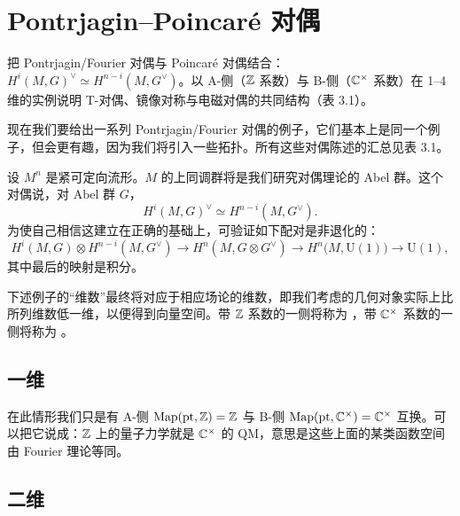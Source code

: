 \section{Pontrjagin--Poincaré 对偶}

\begin{sectionkey}
把 Pontrjagin/Fourier 对偶与 Poincaré 对偶结合：$H^{i}(M,G)^{\vee}\simeq H^{n-i}(M,G^{\vee})$。以 A-侧（$\mathbb{Z}$ 系数）与 B-侧（$\mathbb{C}^{\times}$ 系数）在 1--4 维的实例说明 T-对偶、镜像对称与电磁对偶的共同结构（表 3.1）。
\end{sectionkey}

现在我们要给出一系列 Pontrjagin/Fourier 对偶的例子，它们基本上是同一个例子，但会更有趣，因为我们将引入一些拓扑。所有这些对偶陈述的汇总见表 3.1。

设 $M^{n}$ 是紧可定向流形。$M$ 的上同调群将是我们研究对偶理论的 Abel 群。这个对偶说，对 Abel 群 $G$，
\begin{equation}\tag{3.113}
H^{i}(M,G)^{\vee}\simeq H^{n-i}(M,G^{\vee}).
\end{equation}
为使自己相信这建立在正确的基础上，可验证如下配对是非退化的：
\begin{equation}\tag{3.114}
H^{i}(M,G)\otimes H^{n-i}(M,G^{\vee})
\to H^{n}(M,G\otimes G^{\vee})
\to H^{n}\bigl(M,\mathrm{U}(1)\bigr)
\to\mathrm{U}(1),
\end{equation}
其中最后的映射是积分。

下述例子的“维数”最终将对应于相应场论的维数，即我们考虑的几何对象实际上比所列维数低一维，以便得到向量空间。带 $\mathbb{Z}$ 系数的一侧将称为 ，带 $\mathbb{C}^{\times}$ 系数的一侧将称为 。

\subsection{一维}

在此情形我们只是有 A-侧 $\operatorname{Map}(\mathrm{pt},\mathbb{Z})=\mathbb{Z}$ 与 B-侧 $\operatorname{Map}(\mathrm{pt},\mathbb{C}^{\times})=\mathbb{C}^{\times}$ 互换。可以把它说成：$\mathbb{Z}$ 上的量子力学就是 $\mathbb{C}^{\times}$ 的 QM，意思是这些上面的某类函数空间由 Fourier 理论等同。

\subsection{二维}

